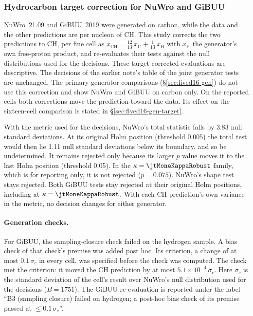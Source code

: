 \subsubsection{Hydrocarbon target correction for NuWro and GiBUU}

NuWro~21.09 and GiBUU~2019 were generated on carbon, while the data and the other predictions are per nucleon of CH. This study corrects the two predictions to CH, per fine cell as $x_{\mathrm{CH}}=\tfrac{12}{13}\,x_{\mathrm{C}}+\tfrac{1}{13}\,x_{\mathrm{H}}$ with $x_{\mathrm{H}}$ the generator's own free-proton product, and re-evaluates their tests against the null distributions used for the decisions. These target-corrected evaluations are descriptive. The decisions of the earlier note's table of the joint generator tests are unchanged. The primary generator comparisons (\S\ref{sec:fived16-gen}) do not use this correction and show NuWro and GiBUU on carbon only. On the reported cells both corrections move the prediction toward the data. Its effect on the sixteen-cell comparison is stated in \S\ref{sec:fived16-gen-target}.

With the metric used for the decisions, NuWro's total statistic falls by 3.83 null standard deviations. At its original Holm position (threshold 0.005) the total test would then lie 1.11 null standard deviations below its boundary, and so be undetermined. It remains rejected only because its larger $p$ value moves it to the last Holm position (threshold 0.05). In the $\kappa=\jtMoneKappaRobust$ family, which is for reporting only, it is not rejected ($p=0.075$). NuWro's shape test stays rejected. Both GiBUU tests stay rejected at their original Holm positions, including at $\kappa=\jtMoneKappaRobust$. With each CH prediction's own variance in the metric, no decision changes for either generator.

\paragraph{Generation checks.} For GiBUU, the sampling-closure check failed on the hydrogen sample. A bias check of that check's premise was added post hoc. Its criterion, a change of at most $0.1\,\sigma_{c}$ in every cell, was specified before the check was computed. The check met the criterion: it moved the CH prediction by at most $5.1\times10^{-4}\,\sigma_{c}$. Here $\sigma_{c}$ is the standard deviation of the cell's result over NuWro's null distribution used for the decisions ($B=1751$). The GiBUU re-evaluation is reported under the label ``B3 (sampling closure) failed on hydrogen; a post-hoc bias check of its premise passed at $\le0.1\,\sigma_{c}$''.

